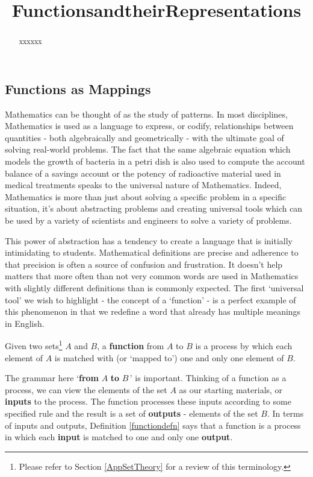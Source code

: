 \documentclass{ximera}
\title{FunctionsandtheirRepresentations} \license{CC BY-NC-SA 4.0}
\begin{document}
\begin{abstract} xxxxxx
\end{abstract}
\maketitle

\subsection{Functions as Mappings}

Mathematics can be thought of as the study of patterns.   In most disciplines, Mathematics is used as a language to express, or codify, relationships between quantities  - both algebraically and geometrically - with the ultimate goal of solving real-world problems.   The fact that the same algebraic equation which models the growth of bacteria in a petri dish is also used to compute the account balance of a savings account or the potency of radioactive material used in medical treatments speaks to the universal nature of Mathematics.   Indeed, Mathematics is more than just about solving a specific problem in a specific situation, it's about abstracting problems and creating universal tools which can be used by a variety of scientists and engineers to solve a variety of problems.  

This power of abstraction has a tendency to create a language that is initially intimidating to students.  Mathematical definitions are precise and adherence to that precision is often a source of confusion and frustration.  It doesn't help matters that more often than not very common words are used in Mathematics with slightly different definitions than is commonly expected.  The first `universal tool' we wish to highlight - the concept of a `function' - is a perfect example of this phenomenon in that we redefine a word that already has multiple meanings in English.  

\begin{definition}\label{functiondefn}

Given two sets\footnote{Please refer to Section \ref{AppSetTheory} for a review of this terminology.} $A$ and $B$, a   \textbf{function} from $A$ to $B$ is a process by which each element of $A$ is matched with (or `mapped to')  one and only one element of $B$.   

\end{definition}

The grammar here `\textbf{from} $A$ \textbf{to} $B\,$'  is important.  Thinking of a function as a process, we can view the elements of the set $A$ as our starting materials, or \textbf{inputs} to the process.  The function  processes these inputs according to some specified rule and the result is a set of  \textbf{outputs}  - elements of the set $B$. In terms of inputs and outputs, Definition \ref{functiondefn}  says that a function is a process in which each \textbf{input} is matched to one and only one \textbf{output}.
\end{document}
